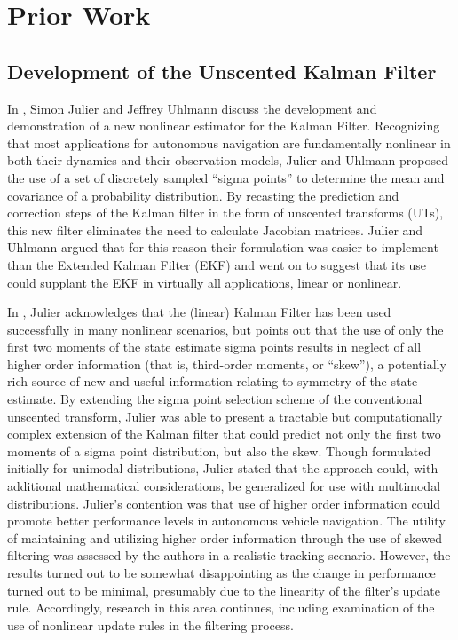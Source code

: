 \chapter{Prior Work}

\section{Development of the Unscented Kalman Filter}

In \cite{Julier1997}, Simon Julier and Jeffrey Uhlmann discuss the development and demonstration of a new nonlinear estimator for the Kalman Filter. Recognizing that most applications for autonomous navigation are fundamentally nonlinear in both their dynamics and their observation models, Julier and Uhlmann proposed the use of a set of discretely sampled ``sigma points'' to determine the mean and covariance of a probability distribution. By recasting the prediction and correction steps of the Kalman filter in the form of unscented transforms (UTs), this new filter eliminates the need to calculate Jacobian matrices. Julier and Uhlmann argued that for this reason their formulation was easier to implement than the Extended Kalman Filter (EKF) and went on to suggest that its use could supplant the EKF in virtually all applications, linear or nonlinear.

In \cite{Julier1998}, Julier acknowledges that the (linear) Kalman Filter has been used successfully in many nonlinear scenarios, but points out that the use of only the first two moments of the state estimate sigma points results in neglect of all higher order information (that is, third-order moments, or ``skew''), a potentially rich source of new and useful information relating to symmetry of the state estimate. By extending the sigma point selection scheme of the conventional unscented transform, Julier was able to present a tractable but computationally complex extension of the Kalman filter that could predict not only the first two moments of a sigma point distribution, but also the skew. Though formulated initially for unimodal distributions, Julier stated that the approach could, with additional mathematical considerations, be generalized for use with multimodal distributions. Julier's contention was that use of higher order information could promote better performance levels in autonomous vehicle navigation. The utility of maintaining and utilizing higher order information through the use of skewed filtering was assessed by the authors in a realistic tracking scenario. However, the results turned out to be somewhat disappointing as the change in performance turned out to be minimal, presumably due to the linearity of the filter's update rule. Accordingly, research in this area continues, including examination of the use of nonlinear update rules in the filtering process.

